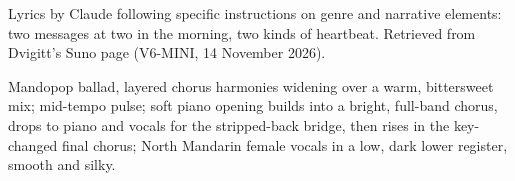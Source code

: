 
\begin{notes}
Lyrics by Claude following specific instructions on genre and narrative elements: two messages at two in the morning, two kinds of heartbeat. Retrieved from Dvigitt's Suno page (V6-MINI, 14 November 2026).
\end{notes}
\begin{style}
Mandopop ballad, layered chorus harmonies widening over a warm, bittersweet mix; mid-tempo pulse; soft piano opening builds into a bright, full-band chorus, drops to piano and vocals for the stripped-back bridge, then rises in the key-changed final chorus; North Mandarin female vocals in a low, dark lower register, smooth and silky.
\end{style}
